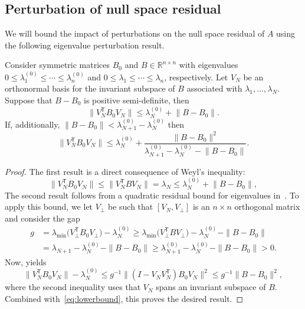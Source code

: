 \documentclass{siamart190516}
\newcommand{\Ttran}{\mathsf{T}}
\newcommand{\R}{\mathbb{R}}
\providecommand{\norm}[1]{\lVert#1\rVert}
\begin{document}
\subsection{Perturbation of null space residual}

We will bound the impact of perturbations on the null space residual of $A$ using the following eigenvalue perturbation result. 
\begin{lemma}
    \label{propEvalPert}
    Consider symmetric matrices $B_{0}$ and $B \in \R^{n\times n}$ with eigenvalues
    $0\leq \lambda_{1}^{(0)} \leq \dotsb\leq \lambda^{(0)}_{n}$
    and $0\leq \lambda_{1} \leq \dotsb\leq \lambda_{n}$, respectively.
    Let $V_{N}$ be an orthonormal basis for the invariant subspace of $B$ associated with $\lambda_{1}, \dotsc, \lambda_{N}$. Suppose that $B-B_{0}$ is positive semi-definite, then 
    \begin{equation*}
        \norm{V_{N}^{\Ttran}B_{0}V_{N}} \leq \lambda_{N}^{(0)}+ \norm{B-B_{0}}.
    \end{equation*}
    If, additionally, $\norm{B-B_{0}}<\lambda_{N+1}^{(0)}-\lambda_{N}^{(0)}$ then 
    \begin{equation*}
        \norm{V_{N}^{\Ttran}B_{0}V_{N}}\leq \lambda_{N}^{(0)}+\frac{\norm{B-B_{0}}^{2}}{\lambda_{N+1}^{(0)}-\lambda_{N}^{(0)}-\norm{B-B_{0}}}.
    \end{equation*}
\end{lemma}

\begin{proof}
    The first result is a direct consequence of Weyl's inequality:
    \begin{equation*}
        \norm{V_{N}^{\Ttran}B_{0}V_{N}} \leq \norm{V_{N}^{\Ttran}BV_{N}}
        =\lambda_N 
        \leq \lambda_{N}^{(0)}+\norm{B-B_{0}},
    \end{equation*}
    The second result follows from a quadratic residual bound for eigenvalues in~\cite[Theorem~1]{Mathias1998}. To apply this bound, we let $V_\perp$ be such that $[V_N,V_\perp]$ is an $n\times n$ orthogonal matrix and consider the gap
    \begin{equation}
        \label{eq:lowerbound}
        \begin{aligned}
            g &= \lambda_{\min}\big( V_\perp^{\Ttran} B_0 V_\perp \big) - \lambda_{N}^{(0)}
     \ge \lambda_{\min}\big( V_\perp^{\Ttran} B V_\perp \big) - \lambda_{N}^{(0)} - \|B-B_0\|   \\
     &=  \lambda_{N+1} - \lambda_{N}^{(0)} - \|B-B_0\| \ge 
     \lambda_{N+1}^{(0)} - \lambda_{N}^{(0)} -  \|B-B_0\| > 0.
        \end{aligned}
    \end{equation}
    Now, \cite[Theorem~1]{Mathias1998} yields
    \begin{equation*}
        \norm{V_{N}^{\Ttran}B_{0}V_{N}}-\lambda_{N}^{(0)}
        \leq g^{-1} \norm{(I-V_{N}V_{N}^{\Ttran})B_{0}V_{N}}^{2} \le
        g^{-1} \norm{B-B_{0}}^{2},
    \end{equation*}
    where the second inequality uses that $V_{N}$ spans an invariant subspace of $B$. Combined with~\cref{eq:lowerbound}, this proves the desired result.
\end{proof}
\end{document}
